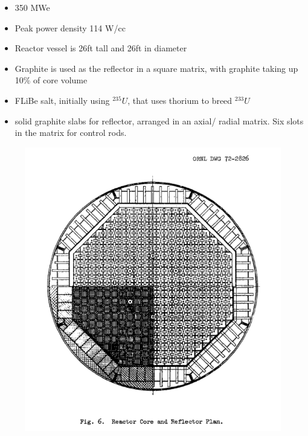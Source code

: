 \documentclass[letterpaper]{article}
\begin{document}
\begin{itemize}
\item 350 MWe
\item Peak power density 114 W/cc
\item Reactor vessel is 26ft tall and 26ft in diameter
\item Graphite is used as the reflector in a square matrix, with graphite taking up 10\% of core volume
\item FLiBe salt, initially using ${}^{235}U$, that uses thorium to breed ${}^{233}U$
\item solid graphite slabs for reflector, arranged in an axial/ radial matrix.  Six slots in the matrix for control rods.
\end{itemize}

\begin{figure}[H]
  \centering
  \includegraphics[width=1.0\linewidth]{figures/MSDRsource1.png}
  \label{fig:fig5}
\end{figure}
\end{document}
